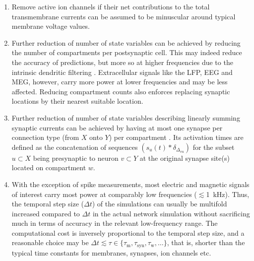 \begin{enumerate}
\item Remove active ion channels  if their net contributions to the total transmembrane currents can be assumed to be minuscular around typical membrane voltage values. 

\item Further reduction of number of state variables 
can be achieved by reducing the number of compartments per postsynaptic cell. 
This may indeed reduce the accuracy of  predictions, 
but more so at higher frequencies due to the intrinsic dendritic filtering . 
Extracellular signals like the LFP, EEG and MEG, however, carry more power at lower frequencies and may be less affected. 
Reducing compartment counts also enforces replacing synaptic locations by their nearest suitable location.

\item Further reduction of number of state variables describing linearly summing synaptic currents can be achieved by having at most one synapse per connection type (from $X$ onto $Y$) per compartment .
Its activation times are defined as the concatenation of sequences $\left(s_u(t) \ast \delta_{\Delta_{vu}}\right)$ for the subset $u \subset X$ being presynaptic to neuron $v \subset Y$ at the original synapse site(s) located on compartment $w$. 

\item With the exception of spike measurements, most electric and magnetic signals of interest carry most power at comparably low frequencies ($\lesssim$\SI{1}{\kilo\hertz}).
Thus, the temporal step size ($\Delta t$) of the simulations can usually be multifold increased compared to $\Delta t$ in the actual network simulation without sacrificing much in terms of accuracy in the relevant low-frequency range.
The computational cost is inversely proportional to the temporal step size,
and a reasonable choice may be $\Delta t \lesssim \tau \in \{ \tau_\text{m}, \tau_\text{syn}, \tau_\text{w}, \ldots \}$,
that is, shorter than the typical time constants for membranes, synapses, ion channels etc.

\end{enumerate}

